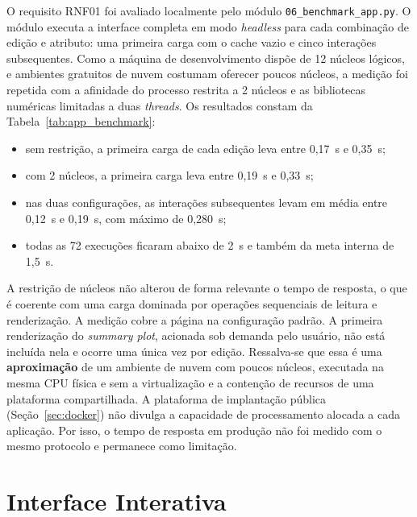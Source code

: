 O requisito RNF01 foi avaliado localmente pelo módulo \texttt{06\_benchmark\_app.py}. O módulo executa a interface completa em modo \textit{headless} para cada combinação de edição e atributo: uma primeira carga com o cache vazio e cinco interações subsequentes. Como a máquina de desenvolvimento dispõe de 12 núcleos lógicos, e ambientes gratuitos de nuvem costumam oferecer poucos núcleos, a medição foi repetida com a afinidade do processo restrita a 2 núcleos e as bibliotecas numéricas limitadas a duas \textit{threads}. Os resultados constam da Tabela~\ref{tab:app_benchmark}:
\begin{itemize}
    \item sem restrição, a primeira carga de cada edição leva entre 0,17~s e 0,35~s;
    \item com 2 núcleos, a primeira carga leva entre 0,19~s e 0,33~s;
    \item nas duas configurações, as interações subsequentes levam em média entre 0,12~s e 0,19~s, com máximo de 0,280~s;
    \item todas as 72 execuções ficaram abaixo de 2~s e também da meta interna de 1,5~s.
\end{itemize}
A restrição de núcleos não alterou de forma relevante o tempo de resposta, o que é coerente com uma carga dominada por operações sequenciais de leitura e renderização. A medição cobre a página na configuração padrão. A primeira renderização do \textit{summary plot}, acionada sob demanda pelo usuário, não está incluída nela e ocorre uma única vez por edição. Ressalva-se que essa é uma \textbf{aproximação} de um ambiente de nuvem com poucos núcleos, executada na mesma CPU física e sem a virtualização e a contenção de recursos de uma plataforma compartilhada. A plataforma de implantação pública (Seção~\ref{sec:docker}) não divulga a capacidade de processamento alocada a cada aplicação. Por isso, o tempo de resposta em produção não foi medido com o mesmo protocolo e permanece como limitação.



\section{Interface Interativa}
\label{sec:interface}

